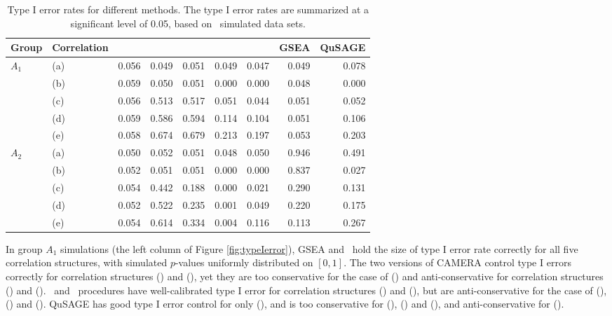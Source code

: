 			\begin{landscape}		
				\begin{table}[th]
					\caption[Type I error rates for different methods]{Type I error rates for 
					different methods. The type I error rates are 
					summarized at a significant level of 0.05, based on \HowmanySimu~simulated data 
					sets.}
					\label{table:apptypeIerror1}
					\centering
					\begin{tabular}{llrrrrrrr}
						\hline
						Group & Correlation & \OurMethod & \genr & \gent & \CMT & \CMR & GSEA & 
						QuSAGE 
						\\
						\hline
						\multirow{5}{*}{$A_1$}  & (a) & 0.056 & 0.049 & 0.051 & 0.049 & 0.047 & 
						0.049 & 
						0.078 
						\\ 
						& (b) & 0.059 & 0.050 & 0.051 & 0.000 & 0.000 & 0.048 & 0.000 \\ 
						& (c) & 0.056 & 0.513 & 0.517 & 0.051 & 0.044 & 0.051 & 0.052 \\ 
						& (d) & 0.059 & 0.586 & 0.594 & 0.114 & 0.104 & 0.051 & 0.106 \\ 
						& (e) & 0.058 & 0.674 & 0.679 & 0.213 & 0.197 & 0.053 & 0.203 \\ \hline
						\multirow{5}{*}{$A_2$} & (a) & 0.050 & 0.052 & 0.051 & 0.048 & 0.050 & 
						0.946 & 
						0.491 \\ 
						& (b) & 0.052 & 0.051 & 0.051 & 0.000 & 0.000 & 0.837 & 0.027 \\ 
						& (c) & 0.054 & 0.442 & 0.188 & 0.000 & 0.021 & 0.290 & 0.131 \\ 
						& (d) & 0.052 & 0.522 & 0.235 & 0.001 & 0.049 & 0.220 & 0.175 \\ 
						& (e) & 0.054 & 0.614 & 0.334 & 0.004 & 0.116 & 0.113 & 0.267 \\ 
						\hline
					\end{tabular}
				\end{table}
				
			\end{landscape}	
			
	
		
	In group $A_1$ simulations (the left column of Figure \ref{fig:typeIerror}),  GSEA and
	\OurMethod~hold the size of type I error rate correctly for all five correlation structures, 
	with simulated $p$-values uniformly distributed on $[0, 1]$. The two versions of CAMERA control 
	type I errors correctly for correlation structures (\aaCase) and (\aCase), yet they are too 
	conservative for the case of (\cCase) and anti-conservative for correlation structures (\eCase) 
	and (\fCase). \gent~and \genr~procedures have well-calibrated type I error for correlation 
	structures (\aaCase) and (\cCase), but are anti-conservative for the case of (\aCase), (\eCase) 
	and (\fCase). QuSAGE has good type I error control for only (\aCase), and is too conservative 
	for (\aaCase), (\eCase) and	(\fCase), and anti-conservative for (\cCase).
	
